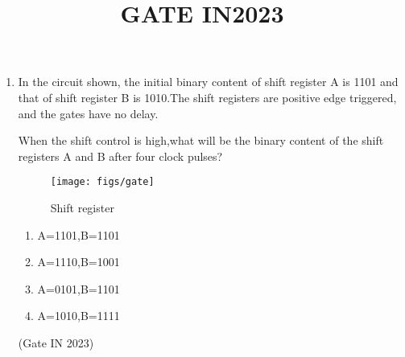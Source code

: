 \documentclass{article}
\begin{document}
\title{\textbf{GATE IN2023}}
\date{}
\maketitle
\begin{enumerate}
\item In the circuit shown, the initial binary content of shift register A is 1101 and that of shift register B is 1010.The shift registers are positive edge triggered, and the gates have no delay.

When the shift control is high,what will be the binary content of the shift registers A and B after four clock pulses?

		\begin{figure}[!ht]
			\texttt{[image: figs/gate]}
			\caption{Shift register}
			\label{figs:fig1}
		\end{figure}
		\begin{enumerate}
  \item A=1101,B=1101
  \item A=1110,B=1001
  \item A=0101,B=1101
  \item A=1010,B=1111
\end{enumerate}
		\hfill{(Gate IN 2023)}

\end{enumerate}
\end{document}
